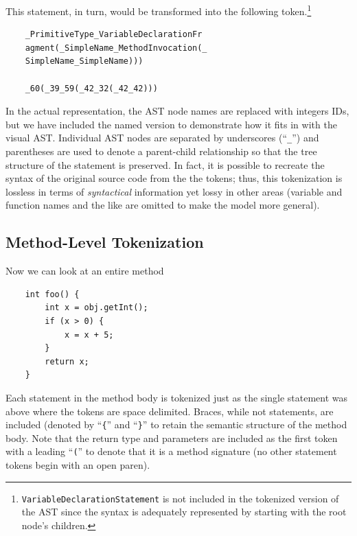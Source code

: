 \documentclass{article}
\begin{document}
This statement, in turn, would be transformed into the following token.\footnote{
\texttt{VariableDeclarationStatement} is not included in the
tokenized version of the AST since the syntax is adequately represented
by starting with the root node's children.}


\begin{verbatim}
    _PrimitiveType_VariableDeclarationFr
    agment(_SimpleName_MethodInvocation(_
    SimpleName_SimpleName)))

    _60(_39_59(_42_32(_42_42)))
\end{verbatim}

In the actual representation, the AST node names are replaced with integers IDs, but we 
have included the named version to demonstrate how it fits in with the visual AST. 
Individual AST nodes are separated by underscores (``\texttt{\_}'') and parentheses are 
used to denote a parent-child relationship so that the tree structure of the  statement 
is preserved. In fact, it is possible  to recreate the syntax of the original source 
code from the the tokens; thus, this  tokenization is lossless in terms of 
\textit{syntactical} information  yet lossy in other areas (variable and function names 
and the like are omitted to make the model more  general). 


\subsection{Method-Level Tokenization}

Now we can look at an entire method

\begin{verbatim}
    int foo() {
        int x = obj.getInt();
        if (x > 0) {
            x = x + 5;
        }
        return x;
    }
\end{verbatim}

Each statement in the method body is tokenized just as the single statement 
was above where the tokens are space delimited. Braces, while not 
statements, are included (denoted by ``\texttt\{'' and
``\texttt\}''  to retain the semantic structure of the method body. 
Note that the return type and parameters are included as the first 
token with a leading ``\texttt('' to denote that it is a method
signature (no other statement tokens begin with an open paren).
\end{document}
